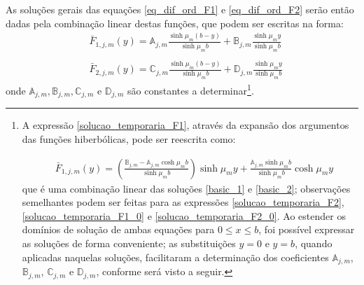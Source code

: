  


As soluções gerais das equações \eqref{eq_dif_ord_F1} e \eqref{eq_dif_ord_F2} serão então dadas pela combinação linear destas funções, que podem ser escritas na forma:
\begin{align}
& \bar{F}_{1,j,m}(y) = \mathbb{A}_{j,m}\frac{\sinh\mu_m (b - y)}{\sinh\mu_m b} + \mathbb{B}_{j,m}\frac{\sinh\mu_m y}{\sinh\mu_m b} \label{solucao_temporaria_F1}\\ \nonumber \\
& \bar{F}_{2,j,m}(y) = \mathbb{C}_{j,m}\frac{\sinh\mu_m (b - y)}{\sinh\mu_m b} + \mathbb{D}_{j,m}\frac{\sinh\mu_m y}{\sinh\mu_m b} \label{solucao_temporaria_F2}
\end{align} 
onde $\mathbb{A}_{j,m}, \mathbb{B}_{j,m}, \mathbb{C}_{j,m}$ e $\mathbb{D}_{j,m}$ são constantes a determinar\footnote{A expressão \eqref{solucao_temporaria_F1}, através da expansão dos argumentos das funções hiberbólicas, pode ser reescrita como:
	
	\begin{align*}
	& \bar{F}_{1,j,m}(y) = \left( \frac{\mathbb{B}_{j,m} - \mathbb{A}_{j,m} \cosh\mu_m b}{\sinh\mu_m b}\right)\sinh\mu_m y + \frac{\mathbb{A}_{j,m}\sinh\mu_m b}{\sinh\mu_m b}\cosh\mu_m y
	\end{align*}	
	que é uma combinação linear das soluções \eqref{basic_1} e \eqref{basic_2}; observações semelhantes podem ser feitas para as expressões \eqref{solucao_temporaria_F2}, \eqref{solucao_temporaria_F1_0} e \eqref{solucao_temporaria_F2_0}. Ao estender os domínios de solução de ambas equações para $0 \le x \le b$, foi possível expressar as soluções de forma conveniente; as substituições $y = 0$ e $y = b$, quando aplicadas naquelas soluções, facilitaram a determinação dos coeficientes $\mathbb{A}_{j,m}$, $\mathbb{B}_{j,m}$, $\mathbb{C}_{j,m}$ e $\mathbb{D}_{j,m}$, conforme será visto a seguir.
	
	}.
	
